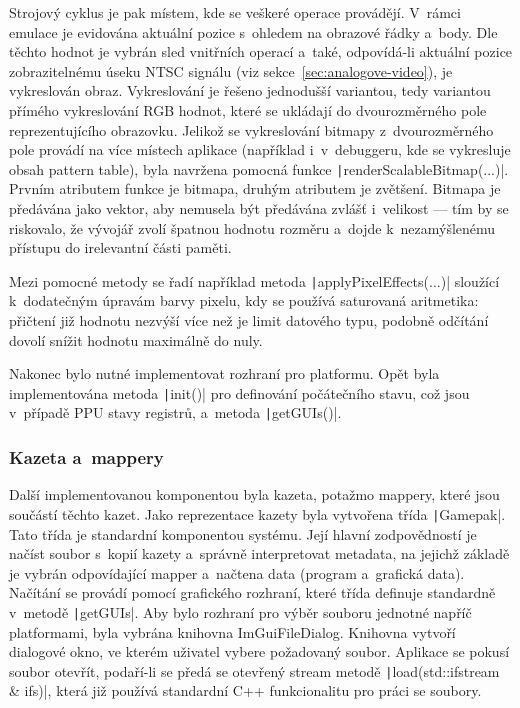 Strojový cyklus je pak místem, kde se veškeré operace provádějí. V~rámci emulace je evidována aktuální pozice s~ohledem na obrazové řádky a~body. Dle těchto hodnot je vybrán sled vnitřních operací a~také, odpovídá-li aktuální pozice zobrazitelnému úseku NTSC signálu (viz sekce~\ref{sec:analogove-video}), je vykreslován obraz. Vykreslování je řešeno jednodušší variantou, tedy variantou přímého vykreslování RGB hodnot, které se ukládají do dvourozměrného pole reprezentujícího obrazovku. Jelikož se vykreslování bitmapy z~dvourozměrného pole provádí na více místech aplikace (například i~v~debuggeru, kde se vykresluje obsah pattern table), byla navržena pomocná funkce \texttt|renderScalableBitmap(...)|. Prvním atributem funkce je bitmapa, druhým atributem je zvětšení. Bitmapa je předávána jako vektor, aby nemusela být předávána zvlášť i~velikost --- tím by se riskovalo, že vývojář zvolí špatnou hodnotu rozměru a~dojde k~nezamýšlenému přístupu do irelevantní části paměti.

Mezi pomocné metody se řadí například metoda \texttt|applyPixelEffects(...)| sloužící k~dodatečným úpravám barvy pixelu, kdy se používá saturovaná aritmetika: přičtení již hodnotu nezvýší více než je limit datového typu, podobně odčítání dovolí snížit hodnotu maximálně do nuly.

Nakonec bylo nutné implementovat rozhraní pro platformu. Opět byla implementována metoda \texttt|init()| pro definování počátečního stavu, což jsou v~případě PPU stavy registrů, a~metoda \texttt|getGUIs()|.

\subsubsection{Kazeta a~mappery}
Další implementovanou komponentou byla kazeta, potažmo mappery, které jsou součástí těchto kazet. Jako reprezentace kazety byla vytvořena třída \texttt|Gamepak|. Tato třída je standardní komponentou systému. Její hlavní zodpovědností je načíst soubor s~kopií kazety a~správně interpretovat metadata, na jejichž základě je vybrán odpovídající mapper a~načtena data (program a~grafická data). Načítání se provádí pomocí grafického rozhraní, které třída definuje standardně v~metodě \texttt|getGUIs|. Aby bylo rozhraní pro výběr souboru jednotné napříč platformami, byla vybrána knihovna ImGuiFileDialog. Knihovna vytvoří dialogové okno, ve kterém uživatel vybere požadovaný soubor. Aplikace se pokusí soubor otevřít, podaří-li se předá se otevřený stream metodě \texttt|load(std::ifstream & ifs)|, která již používá standardní C++ funkcionalitu pro práci se soubory.

